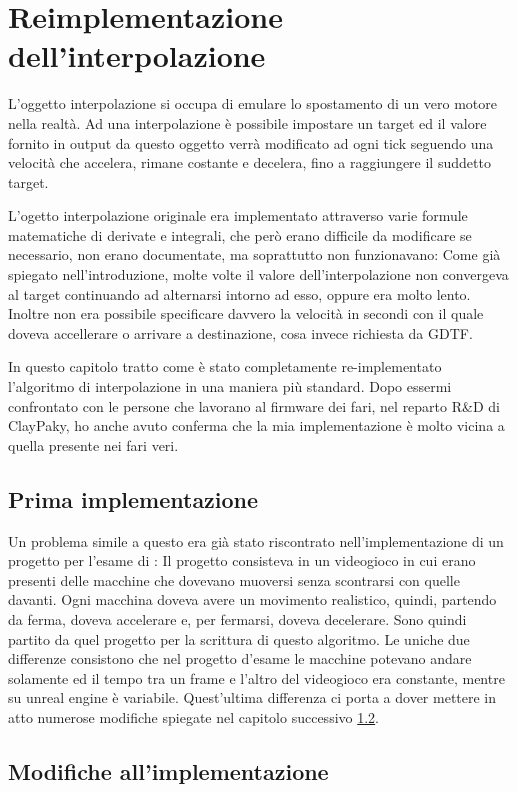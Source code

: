 \documentclass[main.tex]{subfiles}
\begin{document}
\sloppy


\vspace{1.0cm}

\section{Reimplementazione dell'interpolazione}\label{sec:Interpolation}
L'oggetto interpolazione si occupa di emulare lo spostamento di un vero motore nella realtà. Ad una interpolazione è possibile impostare un target ed il valore fornito in output da questo oggetto verrà modificato ad ogni tick seguendo una velocità che accelera, rimane costante e decelera, fino a raggiungere il suddetto target.

L'ogetto interpolazione originale era implementato attraverso varie formule matematiche di derivate e integrali, che però erano difficile da modificare se necessario, non erano documentate, ma soprattutto non funzionavano: Come già spiegato nell'introduzione, molte volte il valore dell'interpolazione non convergeva al target continuando ad alternarsi intorno ad esso, oppure era molto lento. Inoltre non era possibile specificare davvero la velocità in secondi con il quale doveva accellerare o arrivare a destinazione, cosa invece richiesta da GDTF.\newline

In questo capitolo tratto come è stato completamente re-implementato l'algoritmo di interpolazione in una maniera più standard. Dopo essermi confrontato con le persone che lavorano al firmware dei fari, nel reparto R\&D di ClayPaky, ho anche avuto conferma che la mia implementazione è molto vicina a quella presente nei fari veri.

\subsection{Prima implementazione}\label{subsec:4_trafficImplementation}
Un problema simile a questo era già stato riscontrato nell'implementazione di un progetto per l'esame di  \cite{TrafficGame}: Il progetto consisteva in un videogioco in cui erano presenti delle macchine che dovevano muoversi senza scontrarsi con quelle davanti. Ogni macchina doveva avere un movimento realistico, quindi, partendo da ferma, doveva accelerare e, per fermarsi, doveva decelerare. Sono quindi partito da quel progetto per la scrittura di questo algoritmo. Le uniche due differenze consistono che nel progetto d'esame le macchine potevano andare solamente  ed il tempo tra un frame e l'altro del videogioco era constante, mentre su unreal engine è variabile. Quest'ultima differenza ci porta a dover mettere in atto numerose modifiche spiegate nel capitolo successivo \ref{subsec:4_edits}.\newline



\subsection{Modifiche all'implementazione}\label{subsec:4_edits}
\end{document}
